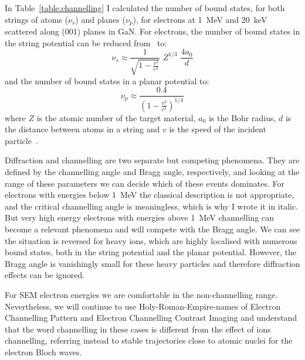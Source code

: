 In Table~\ref{table:channelling} I calculated the number of bound states, for both strings of atoms ($\nu_s$) and planes ($\nu_p$), for electrons at \SI{1}{\mega \electronvolt} and \SI{20}{\kilo \electronvolt} scattered along \hkl(001) planes in GaN. For electrons, the number of bound states in the string potential can be reduced from~\cite{Lindhard65} to:
\begin{equation*}
\nu_s \approx \frac{1}{\sqrt{1-\frac{v^2}{c^2}}}\,\, Z^{1/3} \,\, \frac{4a_0}{d}
\end{equation*}
and the number of bound states in a planar potential to:
\begin{equation*}
\nu_p \approx \frac{0.4}{(1-\frac{v^2}{c^2})^{1/4}} 
\end{equation*}
where $Z$ is the atomic number of the target material, $a_0$ is the Bohr radius, $d$ is the distance between atoms in a string and $v$ is the speed of the incident particle~\cite{Uggerhoj69}.  

Diffraction and channelling are two separate but competing phenomena. They are defined by the channelling angle and Bragg angle, respectively, and looking at the range of these parameters we can decide which of these events dominates. For electrons with energies below \SI{1}{\mega \electronvolt} the classical description is not appropriate, and the critical channelling angle is meaningless, which is why I wrote it in italic. But very high energy electrons with energies above \SI{1}{\mega \electronvolt} channelling can become a relevant phenomena and will compete with the Bragg angle. We can see the situation is reversed for heavy ions, which are highly localised with numerous bound states, both in the string potential and the planar potential. However, the Bragg angle is vanishingly small for these heavy particles and therefore diffraction effects can be ignored. 

For SEM electron energies we are comfortable in the non-channelling range. Nevertheless, we will continue to use Holy-Roman-Empire-names of Electron Channelling Pattern and Electron Channelling Contrast Imaging and understand that the word channelling in these cases is different from the effect of ions channelling, referring instead to stable trajectories close to atomic nuclei for the electron Bloch waves. 





